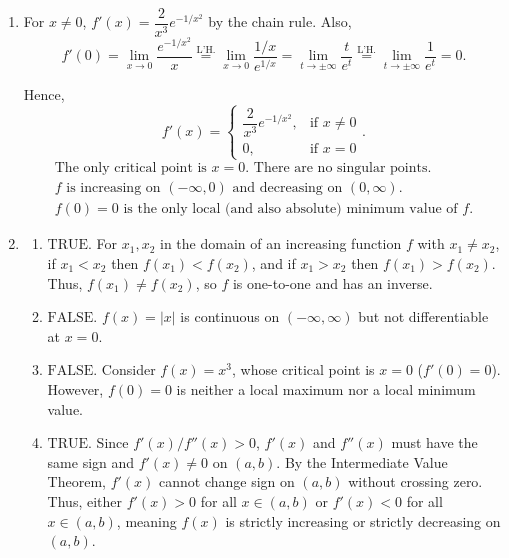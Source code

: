 \documentclass[a4paper, 12pt]{article}
\begin{document}
\begin{enumerate}[leftmargin=*,label=\textbf{\arabic*.}]
\item For $x \ne 0$, $f'(x) = \dfrac{2}{x^3} e^{-1/x^2}$ by the chain rule. Also,
\[f'(0) = \lim_{x \to 0} \frac{e^{-1/x^2}}{x} \overset{\text{L'H.}}{=} \lim_{x\to0}\frac{1/x}{e^{1/x}}=\lim_{t\to\pm\infty}\frac t{e^t}\overset{\text{L'H.}}{=}\lim_{t\to\pm\infty}\frac1{e^t}=0.\]

Hence,
\[f'(x) = \begin{cases} \dfrac{2}{x^3} e^{-1/x^2}, & \text{if } x \ne 0 \\ 0, & \text{if } x = 0 \end{cases}.\]
\[\boxed{
\begin{gathered}
\text{The only critical point is } x=0. \text{ There are no singular points.}\\
f\text{ is increasing on }(-\infty,0)\text{ and decreasing on }(0,\infty).\\
f(0)=0\text{ is the only local (and also absolute) minimum value of }f.
\end{gathered}
}\]

\item 
\begin{enumerate}[leftmargin=*,label=\textbf{\alph*.}]
\item $\boxed{\text{TRUE.}}$ For $x_1, x_2$ in the domain of an increasing function $f$ with $x_1 \ne x_2$, if \linebreak $x_1 < x_2$ then $f(x_1) < f(x_2)$, and if $x_1 > x_2$ then $f(x_1) > f(x_2)$. Thus, $f(x_1) \ne f(x_2)$, so $f$ is one-to-one and has an inverse.

\item $\boxed{\text{FALSE.}}$ $f(x) = |x|$ is continuous on $(-\infty, \infty)$ but not differentiable at $x = 0$.

\item $\boxed{\text{FALSE.}}$ Consider $f(x) = x^3$, whose critical point is $x = 0$ ($f'(0) = 0$). However, $f(0) = 0$ is neither a local maximum nor a local minimum value.

\item $\boxed{\text{TRUE.}}$ Since $f'(x)/f''(x) > 0$, $f'(x)$ and $f''(x)$ must have the same sign and $f'(x) \ne 0$ on $(a, b)$. By the Intermediate Value Theorem, $f'(x)$ cannot change sign on $(a, b)$ without crossing zero. Thus, either $f'(x) > 0$ for all $x \in (a, b)$ or $f'(x) < 0$ for all $x \in (a, b)$, meaning $f(x)$ is strictly increasing or strictly decreasing on $(a, b)$.
\end{enumerate}


\end{enumerate}
\end{document}
